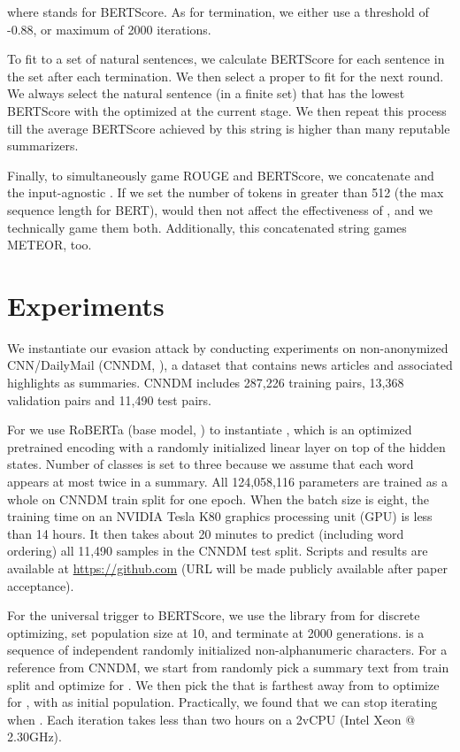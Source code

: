 \documentclass[11pt]{article}
\theoremstyle{remark}
\begin{document}
where  stands for BERTScore. As for termination, we either use a threshold of -0.88, or maximum of 2000 iterations.

To fit  to a set of natural sentences, we calculate BERTScore for each sentence in the set after each termination. We then select a proper  to fit for the next round. We always select the natural sentence (in a finite set) that has the lowest BERTScore with the optimized  at the current stage. We then repeat this process till the average BERTScore achieved by this string is higher than many reputable summarizers.

Finally, to simultaneously game ROUGE and BERTScore, we concatenate  and the input-agnostic . If we set the number of tokens in  greater than 512 (the max sequence length for BERT),  would then not affect the effectiveness of , and we technically game them both. Additionally, this concatenated string games METEOR, too.

\section{Experiments}
We instantiate our evasion attack by conducting experiments on non-anonymized CNN/DailyMail (CNNDM, \citealp{nallapati2016abstractive,see-etal-2017-get}), a dataset that contains news articles and associated highlights as summaries. CNNDM includes 287,226 training pairs, 13,368 validation pairs and 11,490 test pairs. 


For  we use RoBERTa (base model, \citealp{liu2019roberta}) to instantiate , which is an optimized pretrained encoding with a randomly initialized linear layer on top of the hidden states. Number of classes is set to three because we assume that each word appears at most twice in a summary. All 124,058,116 parameters are trained as a whole on CNNDM train split for one epoch. When the batch size is eight, the training time on an NVIDIA Tesla K80 graphics processing unit (GPU) is less than 14 hours. It then takes about 20 minutes to predict (including word ordering) all 11,490 samples in the CNNDM test split. Scripts and results are available at
\url{https://github.com} (URL will be made publicly available after paper acceptance).

For the universal trigger to BERTScore, we use the library from \citet{pymoo} for discrete optimizing, set population size at 10, and terminate at 2000 generations.  is a sequence of independent randomly initialized non-alphanumeric characters. For a reference  from CNNDM, we start from randomly pick a summary text from train split and optimize for . We then pick the  that is farthest away from  to optimize for , with  as initial population. Practically, we found that we can stop iterating when . Each iteration takes less than two hours on a 2vCPU (Intel Xeon @ 2.30GHz).
\end{document}
